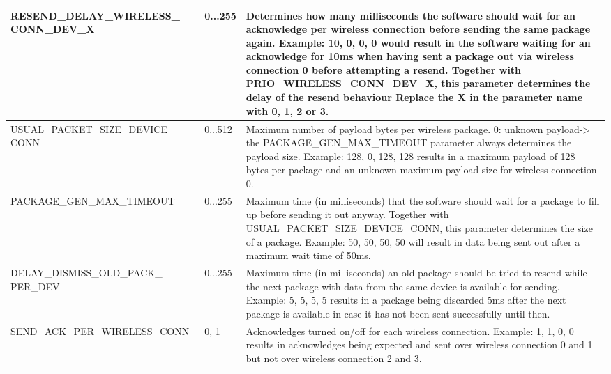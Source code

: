 \begin{center}
\begin{longtable}{p{6cm}p{1cm}p{7cm}}
        \hline
        RESEND\_DELAY\_WIRELESS\_ CONN\_DEV\_X &  0...255 & 
        Determines how many milliseconds the software should wait for an acknowledge per wireless connection before sending the same package again. Example: {10, 0, 0, 0} would result in the software waiting for an acknowledge for 10ms when having sent a package out via wireless connection 0 before attempting a resend. Together with PRIO\_WIRELESS\_CONN\_DEV\_X, this parameter determines the delay of the resend behaviour Replace the X in the parameter name with 0, 1, 2 or 3.\\
        \hline
        USUAL\_PACKET\_SIZE\_DEVICE\_ CONN  &  0...512 & 
        Maximum number of payload bytes per wireless package. 0: unknown payload-> the PACKAGE\_GEN\_MAX\_TIMEOUT parameter always determines the payload size. Example: {128, 0, 128, 128} results in a maximum payload of 128 bytes per package and an unknown maximum payload size for wireless connection 0.\\
        \hline
        PACKAGE\_GEN\_MAX\_TIMEOUT  &  0...255 & 
        Maximum time (in milliseconds) that the software should wait for a package to fill up before sending it out anyway. Together with USUAL\_PACKET\_SIZE\_DEVICE\_CONN, this parameter determines the size of a package. Example: {50, 50, 50, 50} will result in data being sent out after a maximum wait time of 50ms.\\
        \hline
        DELAY\_DISMISS\_OLD\_PACK\_ PER\_DEV &  0...255 & 
        Maximum time (in milliseconds) an old package should be tried to resend while the next package with data from the same device is available for sending. Example: {5, 5, 5, 5} results in a package being discarded 5ms after the next package is available in case it has not been sent successfully until then.\\
        \hline
        SEND\_ACK\_PER\_WIRELESS\_CONN &  0, 1 & 
        Acknowledges turned on/off for each wireless connection. Example: {1, 1, 0, 0} results in acknowledges being expected and sent over wireless connection 0 and 1 but not over wireless connection 2 and 3.\\
        \hline

\end{longtable}
\end{center}

